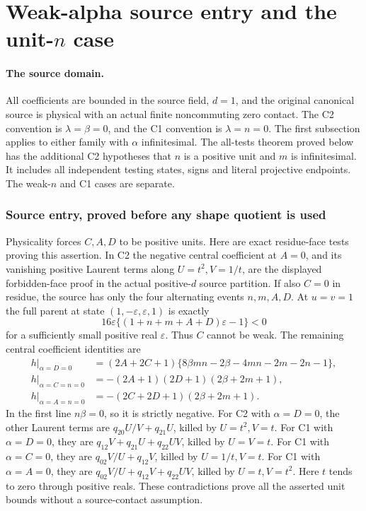 \section{\texorpdfstring{Weak-alpha source entry and the unit-\(n\) case}{Weak-alpha source entry and the unit-n case}}
\label{component:p3a3949869b9e}

\label{p3a3949869b9e:sec:new-weak-alpha-unit-n}

\paragraph{The source domain.}
All coefficients are bounded in the source field, \(d=1\), and the
original canonical source is physical with an actual finite noncommuting
zero contact. The C2 convention is \(\lambda=\beta=0\), and the C1
convention is \(\lambda=n=0\). The first subsection applies to either
family with \(\alpha\) infinitesimal. The all-tests theorem proved below
has the additional C2 hypotheses that \(n\) is a positive unit and \(m\)
is infinitesimal. It includes all independent testing states, signs and
literal projective endpoints. The weak-\(n\) and C1 cases are separate.

\subsubsection*{Source entry, proved before any shape quotient is used}

Physicality forces \(C,A,D\) to be positive units. Here are exact
residue-face tests proving this assertion. In C2 the negative central
coefficient at \(A=0\), and its vanishing positive Laurent terms along
\(U=t^2,V=1/t\), are the displayed forbidden-face proof in the actual
positive-\(d\) source partition. If also \(C=0\) in residue, the source
has only the four alternating events \(n,m,A,D\). At \(u=v=1\) the full
parent at state \((1,-\varepsilon,\varepsilon,1)\) is exactly
\[
 16\varepsilon\{(1+n+m+A+D)\varepsilon-1\}<0
 \tag{WA1}
\]
for a sufficiently small positive real \(\varepsilon\).
Thus \(C\) cannot be weak. The remaining central coefficient identities
are
\[
\begin{aligned}
h|_{\alpha=D=0}
 &=(2A+2C+1)\{8\beta mn-2\beta-4mn-2m-2n-1\},\\
h|_{\alpha=C=n=0}
 &=-(2A+1)(2D+1)(2\beta+2m+1),\\
h|_{\alpha=A=n=0}
 &=-(2C+2D+1)(2\beta+2m+1).
\end{aligned}\tag{WA2}
\]
In the first line \(n\beta=0\), so it is strictly negative. For C2
with \(\alpha=D=0\), the other Laurent terms are
\(q_{20}U/V+q_{21}U\), killed by \(U=t^2,V=t\).
For C1 with \(\alpha=D=0\), they are
\(q_{12}V+q_{21}U+q_{22}UV\), killed by \(U=V=t\).
For C1 with \(\alpha=C=0\), they are \(q_{02}V/U+q_{12}V\),
killed by \(U=1/t,V=t\). For C1 with \(\alpha=A=0\), they are
\(q_{02}V/U+q_{12}V+q_{22}UV\), killed by \(U=t,V=t^2\).
Here \(t\) tends to zero through positive reals. These contradictions
prove all the asserted unit bounds without a source-contact assumption.

